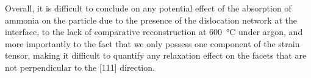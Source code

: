 

Overall, it is difficult to conclude on any potential effect of the absorption of ammonia on the particle due to the presence of the dislocation network at the interface, to the lack of comparative reconstruction at \qty{600}{\degreeCelsius} under argon, and more importantly to the fact that we only possess one component of the strain tensor, making it difficult to quantify any relaxation effect on the facets that are not perpendicular to the [111] direction.


